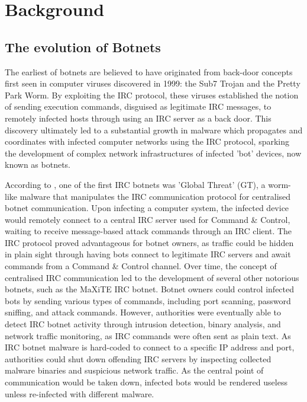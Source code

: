 

\chapter{Background}

\section{The evolution of Botnets}

The earliest of botnets are believed to have originated from back-door concepts first seen in computer viruses discovered in 1999: the Sub7 Trojan and the Pretty Park Worm. By exploiting the IRC protocol, these viruses established the notion of sending execution commands, disguised as legitimate IRC messages, to remotely infected hosts through using an IRC server as a back door. This discovery ultimately led to a substantial growth in malware which propagates and coordinates with infected computer networks using the IRC protocol, sparking the development of complex network infrastructures of infected 'bot' devices, now known as botnets. \citep{Ferguson2010}

According to \citet{Schiller2007}, one of the first IRC botnets was 'Global Threat' (GT), a worm-like malware that manipulates the IRC communication protocol for centralised botnet communication. Upon infecting a computer system, the infected device would remotely connect to a central IRC server used for Command \& Control, waiting to receive message-based attack commands through an IRC client. The IRC protocol proved advantageous for botnet owners, as traffic could be hidden in plain sight through having bots connect to legitimate IRC servers and await commands from a Command \& Control channel. Over time, the concept of centralised IRC communication led to the development of several other notorious botnets, such as the MaXiTE IRC botnet. Botnet owners could control infected bots by sending various types of commands, including port scanning, password sniffing, and attack commands. However, authorities were eventually able to detect IRC botnet activity through intrusion detection, binary analysis, and network traffic monitoring, as IRC commands were often sent as plain text. As IRC botnet malware is hard-coded to connect to a specific IP address and port, authorities could shut down offending IRC servers by inspecting collected malware binaries and suspicious network traffic. As the central point of communication would be taken down, infected bots would be rendered useless unless re-infected with different malware.

